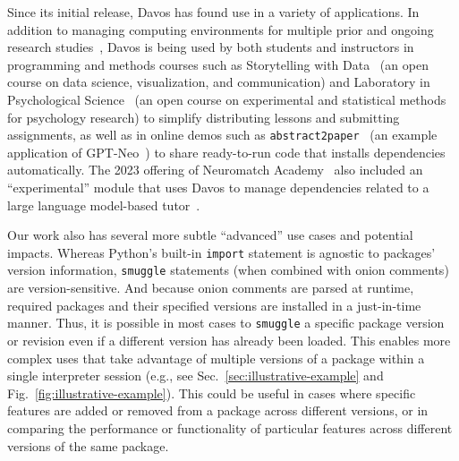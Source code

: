 \documentclass[preprint,12pt,a4paper]{elsarticle}
\begin{document}
Since its initial release, Davos has found use in a variety of applications. In
addition to managing computing environments for multiple prior and ongoing
research studies~\citep{MannEtal23a, OwenMann23, ZimaEtal23}, Davos is being
used by both students and instructors in programming and methods courses such
as Storytelling with Data~\cite{Mann21a} (an open course on data science,
visualization, and communication) and Laboratory in Psychological
Science~\cite{Mann22} (an open course on experimental and statistical methods
for psychology research) to simplify distributing lessons and submitting
assignments, as well as in online demos such as
\texttt{abstract2paper}~\cite{Mann21b} (an example application of
GPT-Neo~\cite{GaoEtal20, BlacEtal21}) to share ready-to-run code that installs
dependencies automatically. The 2023 offering of Neuromatch
Academy~\cite{vanVEtal21} also included an ``experimental'' module that uses
Davos to manage dependencies related to a large language model-based
tutor~\cite{MannEtal23b}.

Our work also has several more subtle ``advanced'' use cases and potential
impacts. Whereas Python's built-in \texttt{import} statement is agnostic to
packages' version information, \texttt{smuggle} statements (when combined with
onion comments) are version-sensitive. And because onion comments are parsed at
runtime, required packages and their specified versions are installed in a
just-in-time manner. Thus, it is possible in most cases to \texttt{smuggle} a
specific package version or revision even if a different version has already
been loaded. This enables more complex uses that take advantage of multiple
versions of a package within a single interpreter session (e.g., see
Sec.~\ref{sec:illustrative-example} and Fig.~\ref{fig:illustrative-example}).
This could be useful in cases where specific features are added or removed from
a package across different versions, or in comparing the performance or
functionality of particular features across different versions of the same
package.
\end{document}
